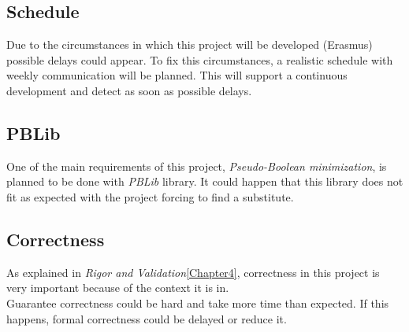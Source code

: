\subsection{Schedule}
Due to the circumstances in which this project will be developed (Erasmus) possible delays could appear. To fix this circumstances, a realistic schedule with weekly communication will be planned. This will support a continuous development and detect as soon as possible delays. 

\subsection{PBLib}
One of the main requirements of this project, \emph{Pseudo-Boolean minimization}, is planned to be done with \emph{PBLib} library. It could happen that this library does not fit as expected with the project forcing to find a substitute. 

\subsection{Correctness}
As explained in \emph{Rigor and Validation}\ref{Chapter4}, correctness in this project is very important because of the context it is in. \\
Guarantee correctness could be hard and take more time than expected. If this happens, formal correctness could be delayed or reduce it. 